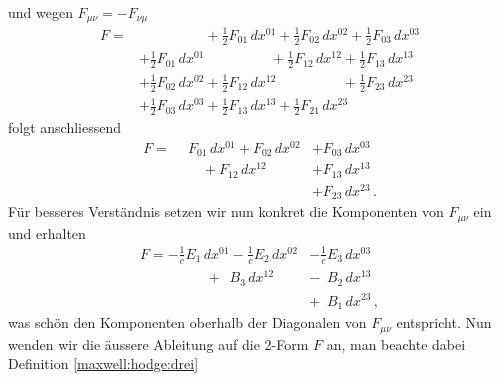 und wegen $F_{\mu\nu} = -F_{\nu\mu}$
\begin{align*}
	F
	=
	&\phantom{+ \frac{1}{2} F_{00} \, dx^{00}} + \frac{1}{2} F_{01} \, dx^{01} + \frac{1}{2} F_{02} \, dx^{02} + \frac{1}{2} F_{03} \, dx^{03}
	\\
	&+ \frac{1}{2} F_{01} \, dx^{01} \phantom{+ \frac{1}{2} F_{11} \, dx^{11}} + \frac{1}{2} F_{12} \, dx^{12} + \frac{1}{2} F_{13} \, dx^{13}
	\\
	&+ \frac{1}{2} F_{02} \, dx^{02} + \frac{1}{2} F_{12} \, dx^{12} \phantom{+ \frac{1}{2} F_{22} \, dx^{22}} + \frac{1}{2} F_{23} \, dx^{23}
	\\
	&+ \frac{1}{2} F_{03} \, dx^{03} + \frac{1}{2} F_{13} \, dx^{13} + \frac{1}{2} F_{21} \, dx^{23} \phantom{+ \frac{1}{2} F_{33} \, dx^{33}}
\end{align*}
folgt anschliessend
\begin{align*}
	F
	=
	\phantom{+} F_{01} \, dx^{01} + F_{02} \, dx^{02} &+ F_{03} \, dx^{03}
	\\
	\phantom{+ F_{11} \, dx^{11}} + F_{12} \, dx^{12} &+ F_{13} \, dx^{13}
	\\
	\phantom{+ F_{12} \, dx^{12}} \phantom{+ F_{22} \, dx^{22}} &+ F_{23} \, dx^{23} \, .
\end{align*}
Für besseres Verständnis setzen wir nun konkret die Komponenten von $F_{\mu\nu}$ ein und erhalten
\begin{align*}
	F
	=
	- \frac{1}{c} E_1 \, dx^{01} - \frac{1}{c} E_2 \, dx^{02} &- \frac{1}{c} E_3 \, dx^{03}
	\\
	\phantom{+ \frac{1}{c} F_{11} \, dx^{11}} + \phantom{\frac{1}{c}} B_3 \, dx^{12} &- \phantom{\frac{1}{c}} B_2 \, dx^{13}
	\\
	\phantom{+ \frac{1}{c} F_{12} \, dx^{12}} \phantom{+ \frac{1}{c} F_{22} \, dx^{22}} &+ \phantom{\frac{1}{c}} B_1 \, dx^{23} \, ,
\end{align*}
was schön den Komponenten oberhalb der Diagonalen von $F_{\mu\nu}$ entspricht.
Nun wenden wir die äussere Ableitung auf die 2-Form $F$ an, man beachte dabei Definition \ref{maxwell:hodge:drei}
